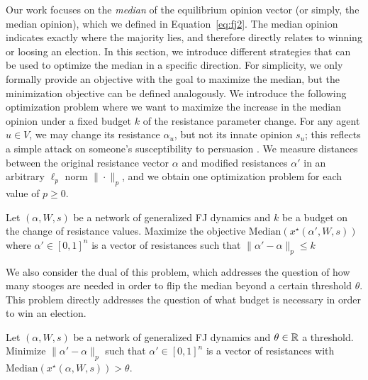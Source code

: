 
Our work focuses on the {\it median} of the equilibrium
opinion vector (or simply, the median opinion),
which we defined in Equation~\eqref{eq:fj2}.
The median opinion indicates exactly where
the majority lies, and therefore directly
relates to winning or loosing an election.
In this section, we introduce different
strategies that can be used to optimize
the median in a specific direction.
%
For simplicity, we only
formally provide an objective with the goal to
maximize the median, but the minimization
objective can be defined analogously.
%
We introduce the following optimization problem
where we want to maximize the increase in the
median opinion under a fixed budget $k$ of the resistance parameter change. 
For any agent $u \in V$, we may change
its resistance $\alpha_u$, but not its
innate opinion $s_u$; this reflects a simple
attack on someone's susceptibility to persuasion
\cite{abebe2020opinion}.
%
We measure distances between the original
resistance vector $\alpha$ and modified
resistances $\alpha'$ in an arbitrary
$\ell_p$ norm $\| \cdot \|_p$, and we obtain
one optimization problem for each value
of $p \ge 0$.

\begin{tcolorbox}
\begin{problem}
\label{prob:max-median} Let $(\alpha, W, s)$ be a network
of generalized FJ dynamics and $k$ be a budget on the change of resistance values. Maximize the objective
$\mathrm{Median}(x^\star(\alpha', W, s))$
where $\alpha' \in [0,1]^n$ is a vector of resistances
such that $\|\alpha' - \alpha\|_p \le k$

\end{problem}
\end{tcolorbox}


We also consider the dual of this problem, which
addresses the question of how many stooges are
needed in order to flip the median beyond
a certain threshold $\theta$. This problem directly addresses the question of what budget is necessary in order to win an election. 

\begin{tcolorbox}
\begin{problem}
\label{prob:elections}
Let $(\alpha, W, s)$ be a network of generalized FJ dynamics
and $\theta \in \mathbb{R}$ a threshold.
Minimize $\|\alpha' - \alpha\|_p$ such that
$\alpha' \in [0,1]^n$ is a vector of resistances
with $\mathrm{Median}(x^\star(\alpha, W, s)) > \theta$.
\end{problem}
\end{tcolorbox}


